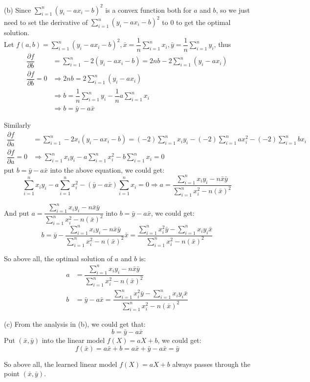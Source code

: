 (b) Since $\sum\limits_{i=1}^n(y_i-ax_i-b)^2$ is a convex function both for $a$ and $b$, so we just need to set the derivative of $\sum\limits_{i=1}^n(y_i-ax_i-b)^2$ to 0 to get the optimal solution. \\
Let $f(a,b)=\sum\limits_{i=1}^n(y_i-ax_i-b)^2,\bar{x}=\dfrac{1}{n}\sum\limits_{i=1}^nx_i,\bar{y}=\dfrac{1}{n}\sum\limits_{i=1}^ny_i$, thus \\
\begin{align*}
\dfrac{\partial f}{\partial b} &= \sum\limits_{i=1}^n-2(y_i-ax_i-b)=2nb-2\sum\limits_{i=1}^n(y_i-ax_i) \\
\dfrac{\partial f}{\partial b}=0 &\Rightarrow 2nb=2\sum\limits_{i=1}^n(y_i-ax_i) \\
&\Rightarrow b=\dfrac{1}{n}\sum\limits_{i=1}^ny_i-\dfrac{1}{n}a\sum\limits_{i=1}^nx_i \\
&\Rightarrow b = \bar{y}-a\bar{x}
\end{align*}

Similarly
\begin{align*}
\dfrac{\partial f}{\partial a} &= \sum\limits_{i=1}^n-2x_i(y_i-ax_i-b)=(-2)\sum\limits_{i=1}^nx_iy_i-(-2)\sum\limits_{i=1}^nax_i^2-(-2)\sum\limits_{i=1}^nbx_i \\
\dfrac{\partial f}{\partial a}=0 &\Rightarrow \sum\limits_{i=1}^nx_iy_i-a\sum\limits_{i=1}^nx_i^2-b\sum\limits_{i=1}^nx_i=0
\end{align*}
put $b=\bar{y}-a\bar{x}$ into the above equation, we could get:
$$\sum\limits_{i=1}^nx_iy_i-a\sum\limits_{i=1}^nx_i^2-(\bar{y}-a\bar{x})\sum\limits_{i=1}^nx_i=0 \Rightarrow a=\dfrac{\sum\limits_{i=1}^nx_iy_i-n\bar{x}\bar{y}}{\sum\limits_{i=1}^nx_i^2-n(\bar{x})^2}$$

And put $a=\dfrac{\sum\limits_{i=1}^nx_iy_i-n\bar{x}\bar{y}}{\sum\limits_{i=1}^nx_i^2-n(\bar{x})^2}$ into $b=\bar{y}-a\bar{x}$, we could get: \\
$$b=\bar{y}-\dfrac{\sum\limits_{i=1}^nx_iy_i-n\bar{x}\bar{y}}{\sum\limits_{i=1}^nx_i^2-n(\bar{x})^2}\bar{x}=\dfrac{\sum\limits_{i=1}^nx_i^2\bar{y}-\sum\limits_{i=1}^nx_iy_i\bar{x}}{\sum\limits_{i=1}^nx_i^2-n(\bar{x})^2}$$

So above all, the optimal solution of $a$ and $b$ is:
\begin{align*}
a &= \dfrac{\sum\limits_{i=1}^nx_iy_i-n\bar{x}\bar{y}}{\sum\limits_{i=1}^nx_i^2-n(\bar{x})^2} \\
b &= \bar{y}-a\bar{x}=\dfrac{\sum\limits_{i=1}^nx_i^2\bar{y}-\sum\limits_{i=1}^nx_iy_i\bar{x}}{\sum\limits_{i=1}^nx_i^2-n(\bar{x})^2}
\end{align*}

(c) From the analysis in (b), we could get that: \\
$$b=\bar{y}-a\bar{x}$$
Put $(\bar{x},\bar{y})$ into the linear model $f(X)=aX+b$, we could get: \\
$$f(\bar{x})=a\bar{x}+b=a\bar{x}+\bar{y}-a\bar{x}=\bar{y}$$

So above all, the learned linear model $f(X)=aX+b$ always passes through the point $(\bar{x},\bar{y})$.

\newpage